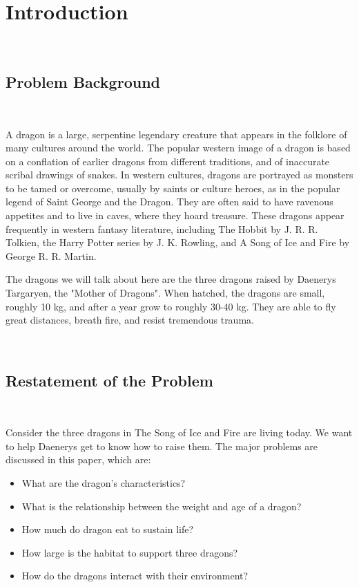 \documentclass{mcmthesis}
\begin{document}
\tableofcontents %
\newpage


\section{Introduction}
~\ \
\subsection{Problem Background}
~\ \

A dragon is a large, serpentine legendary creature that appears in the folklore of many cultures around the world. 
The popular western image of a dragon is based on a conflation of earlier dragons from different traditions, 
and of inaccurate scribal drawings of snakes. 
In western cultures, dragons are portrayed as monsters to be tamed or overcome, usually by saints or culture heroes, 
as in the popular legend of Saint George and the Dragon. 
They are often said to have ravenous appetites and to live in caves, where they hoard treasure. 
These dragons appear frequently in western fantasy literature, including The Hobbit by J. R. R. Tolkien, 
the Harry Potter series by J. K. Rowling, and A Song of Ice and Fire by George R. R. Martin.

The dragons we will talk about here are the three dragons raised by Daenerys Targaryen, the "Mother of Dragons".
When hatched, the dragons are small, roughly 10 kg, and after a year grow to roughly 30-40 kg. 
They are able to fly great distances, breath fire, and resist tremendous trauma.

~\ \
\subsection{Restatement of the Problem}
~\ \

Consider the three dragons in The Song of Ice and Fire are living today. We want to help Daenerys get to know how to raise them.
The major problems are discussed in this paper, which are:

\begin{itemize}
    \item What are the dragon's characteristics?
    \item What is the relationship between the weight and age of a dragon?
    \item How much do dragon eat to sustain life?
    \item How large is the habitat to support three dragons?
    \item How do the dragons interact with their environment?
\end{itemize}
\end{document}
